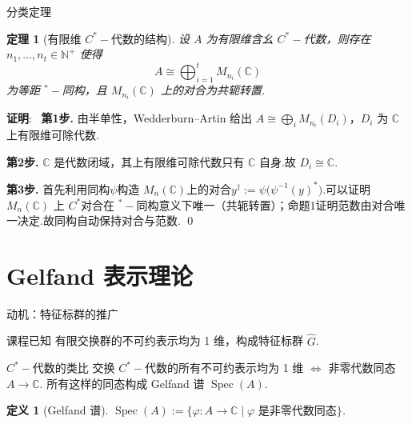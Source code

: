 \documentclass[notheorems,11pt]{beamer}
\theoremstyle{plain}
\newtheorem{theorem}{定理}
\numberwithin{theorem}{section}
\newtheorem{definition}{定义}
\numberwithin{lemma}{section}
\numberwithin{corollary}{section}
\theoremstyle{example}
\renewenvironment{proof}[1][证明]{\textbf{#1}:~}{\qed\par}
\DeclareMathOperator{\Spec}{Spec}
\begin{document}
\begin{frame}{分类定理}
  \begin{theorem}[有限维 $C^*-\!$代数的结构]
    设 $A$ 为有限维含幺 $C^*-\!$代数，则存在 $n_1,\dots,n_t \in \mathbb{N}^+$ 使得
    \begin{equation*}
      A \cong \bigoplus_{i=1}^t M_{n_i}(\mathbb{C})
    \end{equation*}
    为等距 ${}^*-\!$同构，且 $M_{n_i}(\mathbb{C})$ 上的对合为共轭转置.
  \end{theorem}
  \pause
  \begin{proof}\small
    \textbf{第1步.} 由半单性，Wedderburn--Artin 给出 $A \cong \bigoplus_i M_{n_i}(D_i)$，$D_i$ 为 $\mathbb{C}$ 上有限维可除代数.\par
    \textbf{第2步.} $\mathbb{C}$ 是代数闭域，其上有限维可除代数只有 $\mathbb{C}$ 自身.故 $D_i \cong \mathbb{C}$.\par
    \textbf{第3步.} 首先利用同构$\psi$构造 $M_n(\mathbb{C})$上的对合$y^\dag := \psi\bigl(\psi^{-1}(y)^*\bigr)$.可以证明 $M_n(\mathbb{C})$ 上 $C^*$对合在 ${}^*-\!$同构意义下唯一（共轭转置）；命题1证明范数由对合唯一决定.故同构自动保持对合与范数.
  \end{proof}
\end{frame}


\section{Gelfand 表示理论}

\begin{frame}{动机：特征标群的推广}
  \begin{block}{课程已知}
    有限交换群的不可约表示均为 1 维，构成特征标群 $\widehat{G}$.
  \end{block}
  \pause
  \begin{block}{$C^*-\!$代数的类比}
    交换 $C^*-\!$代数的所有不可约表示均为 1 维 $\Leftrightarrow$ 非零代数同态 $A \to \mathbb{C}$.
    所有这样的同态构成 \alert{Gelfand 谱} $\Spec(A)$.
  \end{block}
  \pause
    \begin{definition}[Gelfand 谱]
    $\Spec(A) := \{\varphi: A \to \mathbb{C} \mid \varphi \text{ 是非零代数同态}\}$.
  \end{definition}
\end{frame}
\end{document}
